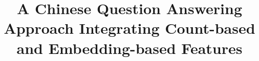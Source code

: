 \documentclass{llncs}
\begin{document}
\title{A Chinese Question Answering Approach Integrating Count-based and Embedding-based Features}
%








\maketitle              %
\end{document}
